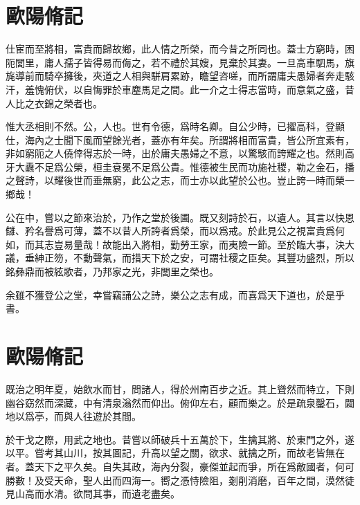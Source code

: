 \section[相州晝錦堂記\quad{\small 歐陽脩}]{{\normalsize 歐陽脩}\quad{}記}
仕宦而至將相，富貴而歸故鄉，此人情之所榮，而今昔之所同也。蓋士方窮時，困阨閭里，庸人孺子皆得易而侮之，若不禮於其嫂，見棄於其妻。一旦高車駟馬，旗旄導前而騎卒擁後，夾道之人相與駢肩累跡，瞻望咨嗟，而所謂庸夫愚婦者奔走駭汗，羞愧俯伏，以自悔罪於車塵馬足之間。此一介之士得志當時，而意氣之盛，昔人比之衣錦之榮者也。

惟大丞相則不然。公，人也。世有令德，爲時名卿。自公少時，已擢高科，登顯仕，海內之士聞下風而望餘光者，蓋亦有年矣。所謂將相而富貴，皆公所宜素有，非如窮阨之人僥倖得志於一時，出於庸夫愚婦之不意，以驚駭而誇耀之也。然則高牙大纛不足爲公榮，桓圭袞冕不足爲公貴。惟德被生民而功施社稷，勒之金石，播之聲詩，以耀後世而垂無窮，此公之志，而士亦以此望於公也。豈止誇一時而榮一鄉哉！

公在中，嘗以之節來治於，乃作之堂於後圃。既又刻詩於石，以遺人。其言以快恩讎、矜名譽爲可薄，蓋不以昔人所誇者爲榮，而以爲戒。於此見公之視富貴爲何如，而其志豈易量哉！故能出入將相，勤勞王家，而夷險一節。至於臨大事，決大議，垂紳正笏，不動聲氣，而措天下於之安，可謂社稷之臣矣。其豐功盛烈，所以銘彝鼎而被絃歌者，乃邦家之光，非閭里之榮也。

余雖不獲登公之堂，幸嘗竊誦公之詩，樂公之志有成，而喜爲天下道也，於是乎書。%

\section[豐樂亭記\quad{\small 歐陽脩}]{{\normalsize 歐陽脩}\quad{}記}
既治之明年夏，始飲水而甘，問諸人，得於州南百步之近。其上聳然而特立，下則幽谷窈然而深藏，中有清泉滃然而仰出。俯仰左右，顧而樂之。於是疏泉鑿石，闢地以爲亭，而與人往遊於其間。

於干戈之際，用武之地也。昔嘗以師破兵十五萬於下，生擒其將、於東門之外，遂以平。嘗考其山川，按其圖記，升高以望之關，欲求、就擒之所，而故老皆無在者。蓋天下之平久矣。自失其政，海內分裂，豪傑並起而爭，所在爲敵國者，何可勝數！及受天命，聖人出而四海一。嚮之憑恃險阻，剗削消磨，百年之間，漠然徒見山高而水清。欲問其事，而遺老盡矣。

